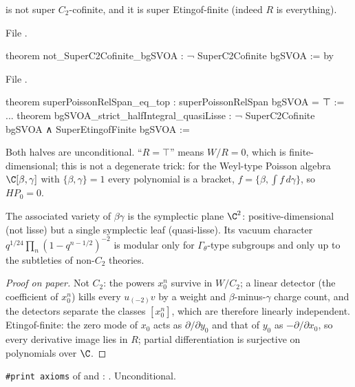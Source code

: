 \begin{theorem}\label{l17:thm:bgquasi}
 is not super $C_2$-cofinite, and it is super Etingof-finite (indeed $R$ is everything).
\end{theorem}
\noindent File .
\begin{leancode}
theorem not_SuperC2Cofinite_bgSVOA : ¬ SuperC2Cofinite bgSVOA := by
\end{leancode}
\noindent File .
\begin{leancode}
theorem superPoissonRelSpan_eq_top : superPoissonRelSpan bgSVOA = ⊤ :=
...
theorem bgSVOA_strict_halfIntegral_quasiLisse :
    ¬ SuperC2Cofinite bgSVOA ∧ SuperEtingofFinite bgSVOA :=
\end{leancode}
\begin{dictionary}
Both halves are unconditional. ``$R=\top$'' means $W/R=0$, which is finite-dimensional; this is not
a degenerate trick: for the Weyl-type Poisson algebra $\C[\beta,\gamma]$ with $\{\beta,\gamma\}=1$ every
polynomial is a bracket, $f=\{\beta,\int f\,d\gamma\}$, so $HP_0=0$.
\end{dictionary}
\begin{physics}
The associated variety of $\beta\gamma$ is the symplectic plane $\C^2$: positive-dimensional
(not lisse) but a single symplectic leaf (quasi-lisse). Its vacuum character
$q^{1/24}\prod_{n}(1-q^{n-1/2})^{-2}$ is modular only for $\Gamma_\theta$-type subgroups and only up
to the subtleties of non-$C_2$ theories.
\end{physics}
\begin{proof}[Proof on paper]
Not $C_2$: the powers $x_0^n$ survive in $W/C_2$; a linear detector (the coefficient of $x_0^n$) kills
every $u_{(-2)}v$ by a weight and $\beta$-minus-$\gamma$ charge count, and the detectors separate the
classes $[x_0^n]$, which are therefore linearly independent. Etingof-finite: the zero mode of $x_0$
acts as $\partial/\partial y_0$ and that of $y_0$ as $-\partial/\partial x_0$, so every derivative
image lies in $R$; partial differentiation is surjective on polynomials over $\C$.
\end{proof}
\begin{status}
\texttt{\#print axioms} of  and
: . Unconditional.
\end{status}

